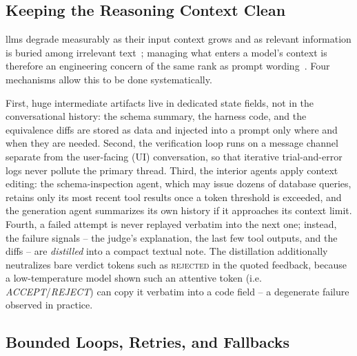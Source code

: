 \subsection{Keeping the Reasoning Context Clean}
\label{sec:design-isolation}

\Acrshort{llm}s degrade measurably as their input context grows and as relevant information is buried among irrelevant text~\cite{liuLostInTheMiddle2024}; managing what enters a model's context is therefore an engineering concern of the same rank as prompt wording~\cite{anthropicContextEngineering2025}. Four mechanisms allow this to be done systematically.

First, huge intermediate artifacts live in dedicated state fields, not in the conversational history: the schema summary, the harness code, and the equivalence diffs are stored as data and injected into a prompt only where and when they are needed. Second, the verification loop runs on a message channel separate from the user-facing (UI) conversation, so that iterative trial-and-error logs never pollute the primary thread. Third, the interior agents apply context editing: the schema-inspection agent, which may issue dozens of database queries, retains only its most recent tool results once a token threshold is exceeded, and the generation agent summarizes its own history if it approaches its context limit. Fourth, a failed attempt is never replayed verbatim into the next one; instead, the failure signals -- the judge's explanation, the last few tool outputs, and the diffs -- are \emph{distilled} into a compact textual note. The distillation additionally neutralizes bare verdict tokens such as \textsc{rejected} in the quoted feedback, because a low-temperature model shown such an attentive token (i.e. \emph{ACCEPT}/\emph{REJECT}) can copy it verbatim into a code field -- a degenerate failure observed in practice.

\subsection{Bounded Loops, Retries, and Fallbacks}
\label{sec:design-bounds}

